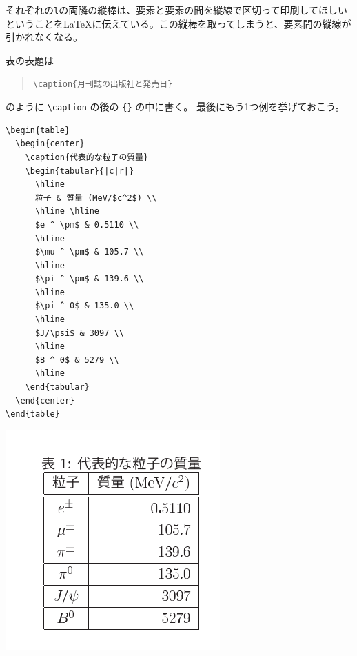 それぞれの\texttt{l}の両隣の縦棒は、要素と要素の間を縦線で区切って印刷してほしいということを\LaTeX に伝えている。この縦棒を取ってしまうと、要素間の縦線が引かれなくなる。

表の表題は
\begin{quotation}
  \verb|\caption{月刊誌の出版社と発売日}|
\end{quotation}
のように \verb|\caption| の後の \verb|{}| の中に書く。
最後にもう1つ例を挙げておこう。
\begin{reidai}
\begin{verbatim}
\begin{table}
  \begin{center}
    \caption{代表的な粒子の質量}
    \begin{tabular}{|c|r|}
      \hline
      粒子 & 質量 (MeV/$c^2$) \\
      \hline \hline
      $e ^ \pm$ & 0.5110 \\
      \hline
      $\mu ^ \pm$ & 105.7 \\
      \hline
      $\pi ^ \pm$ & 139.6 \\
      \hline
      $\pi ^ 0$ & 135.0 \\
      \hline
      $J/\psi$ & 3097 \\
      \hline
      $B ^ 0$ & 5279 \\
      \hline
    \end{tabular}
  \end{center}
\end{table}
\end{verbatim}
\end{reidai}
\vspace*{-1.5em}
\begin{kekka}
  \begin{center}
    \includegraphics{table2.pdf}
  \end{center}
\end{kekka}

